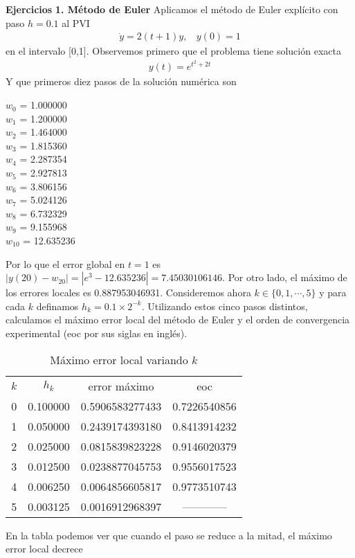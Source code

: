 \documentclass[11pt]{article}
\begin{document}
$ $\\
$ $\\ 
\noindent
\textbf{\LARGE{Ejercicios}}
\newline
\textbf{1. Método de Euler}
\newline
Aplicamos el método de Euler explícito con paso $h = 0.1$ al PVI
\begin{align}
\dot{y} = 2(t+1)y, \ \ \ \ y(0) = 1
\end{align}
en el intervalo [0,1]. Observemos primero que el problema tiene solución exacta
\begin{align}
y(t) = e^{t^2+2t}
\end{align}
Y que primeros diez pasos de la solución numérica son
\begin{multicols}{3}
\noindent
$w_0$ = 1.000000\\
$w_1$ = 1.200000 \\
$w_2$ = 1.464000 \\
$w_3$ = 1.815360 \\
$w_4$ = 2.287354 \\
$w_5$ = 2.927813 \\
$w_6$ = 3.806156 \\
$w_7$ = 5.024126 \\
$w_8$ = 6.732329 \\
$w_9$ = 9.155968 \\
$w_{10}$ = 12.635236
\end{multicols}
\noindent
Por lo que el error global en $t=1$ es $|y(20)-w_{20}| = |e^3 - 12.635236| = 
7.45030106146.$ Por otro lado, el máximo de los errores locales es 0.887953046931. 
Consideremos ahora $k \in \{0, 1, \cdots, 5\}$ y para cada $k$ definamos $h_k =
0.1 \times 2^{-k}$.  Utilizando estos cinco pasos distintos, calculamos el máximo
error local del método de Euler y el orden de convergencia experimental (eoc por sus 
siglas en inglés).
\begin{table}[h]
\caption{Máximo error local variando $k$}
\centering
\begin{tabular}{cccc}
\hline \hline
$k$ & $h_k$ & error máximo & eoc \\ [0.5ex]
0 & 0.100000 & 0.5906583277433 & 0.7226540856 \\
1 & 0.050000 & 0.2439174393180 & 0.8413914232 \\
2 & 0.025000 & 0.0815839823228 & 0.9146020379 \\
3 & 0.012500 & 0.0238877045753 & 0.9556017523 \\
4 & 0.006250 & 0.0064856605817 & 0.9773510743 \\
5 & 0.003125 & 0.0016912968397 & ------------ \\
\hline
\end{tabular}
\label{tab:hresult}
\end{table}
En la tabla podemos ver que cuando el paso se reduce a la mitad, el máximo
error local decrece
\end{document}
